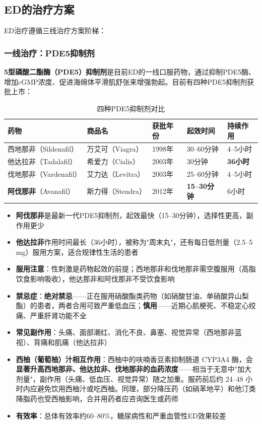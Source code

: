 \subsection{ED的治疗方案}

ED治疗遵循三线治疗方案阶梯：

\subsubsection{一线治疗：PDE5抑制剂}

\textbf{5型磷酸二酯酶（PDE5）抑制剂}是目前ED的一线口服药物，通过抑制PDE5酶、增加cGMP浓度、促进海绵体平滑肌舒张来增强勃起。目前有四种PDE5抑制剂获批上市：

\begin{table}[htbp]
\centering
\caption{四种PDE5抑制剂对比}
\label{tab:pde5_inhibitors}
\begin{tabularx}{\textwidth}{@{}lllll@{}}
    \toprule
    \textbf{药物} & \textbf{商品名} & \textbf{获批年份} & \textbf{起效时间} & \textbf{持续作用} \\
    \midrule
    西地那非（Sildenafil） & 万艾可（Viagra） & 1998年 & 30--60分钟 & 4--5小时 \\
    他达拉非（Tadalafil） & 希爱力（Cialis） & 2003年 & 30分钟 & \textbf{36小时} \\
    伐地那非（Vardenafil） & 艾力达（Levitra） & 2003年 & 25--60分钟 & 4--5小时 \\
    \textbf{阿伐那非}（Avanafil） & 斯力得（Stendra） & 2012年 & \textbf{15--30分钟} & 6小时 \\
    \bottomrule
\end{tabularx}
\end{table}

\begin{itemize}[leftmargin=2cm]
	\item \textbf{阿伐那非}是最新一代PDE5抑制剂，起效最快（15--30分钟），选择性更高，副作用更少
	\item \textbf{他达拉非}作用时间最长（36小时），被称为"周末丸"，还有每日低剂量（2.5--5 mg）服用方案，适合规律性生活的患者
	\item \textbf{服用注意}：性刺激是药物起效的前提；西地那非和伐地那非需空腹服用（高脂饮食影响吸收），他达那非和阿伐那非不受饮食影响
	\item \textbf{禁忌症}：\textbf{绝对禁忌}——正在服用硝酸酯类药物（如硝酸甘油、单硝酸异山梨酯）的患者，两者合用可致严重低血压；\textbf{慎用}——近期心肌梗死、不稳定心绞痛、严重肝肾功能不全
	\item \textbf{常见副作用}：头痛、面部潮红、消化不良、鼻塞、视觉异常（西地那非蓝视）、背痛和肌痛（他达拉非）
	\item \textbf{西柚（葡萄柚）汁相互作用}：西柚中的呋喃香豆素抑制肠道 CYP3A4 酶，会\textbf{显著升高西地那非、他达拉非、伐地那非的血药浓度}——相当于无意中"加大剂量"，副作用（头痛、低血压、视觉异常）随之加重。服药前后约 24--48 小时内应避免饮用西柚汁或吃西柚。同理，部分降压药（如硝苯地平）和他汀类降脂药也受西柚影响，合并用药者应咨询医生或药师
	\item \textbf{有效率}：总体有效率约60--80\%，糖尿病性和严重血管性ED效果较差
\end{itemize}

